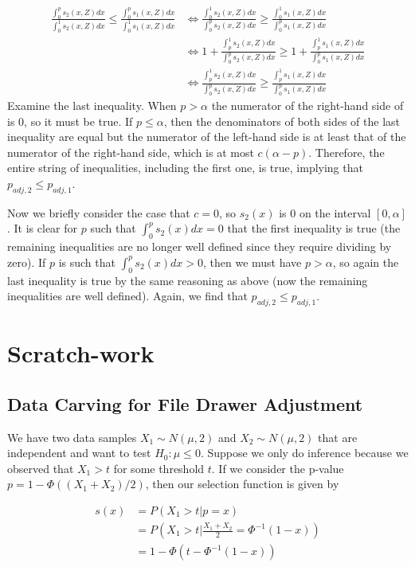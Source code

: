\documentclass{article}
\begin{document}
\begin{appendix}
\begin{align*}
    \frac{\int_0^p s_2(x, Z) dx }{\int_0^1 s_2(x, Z) dx}  \leq \frac{\int_0^p s_1(x, Z) dx }{\int_0^1 s_1(x, Z) dx} &\iff  \frac{\int_0^1 s_2(x, Z) dx}  {\int_0^p s_2(x, Z) dx }\geq \frac{\int_0^1 s_1(x, Z) dx}{\int_0^p s_1(x, Z) dx }\\
    &\iff 1 + \frac{\int_p^1 s_2(x, Z) dx}  {\int_0^p s_2(x, Z) dx }\geq 1 + \frac{\int_p^1 s_1(x, Z) dx}{\int_0^p s_1(x, Z) dx }\\
    &\iff \frac{\int_p^1 s_2(x, Z) dx}  {\int_0^p s_2(x, Z) dx }\geq \frac{\int_p^1 s_1(x, Z) dx}{\int_0^p s_1(x, Z) dx }
\end{align*}
Examine the last inequality. When $p > \alpha$ the numerator of the right-hand side of is $0$, so it must be true. If $p \leq \alpha$, then the denominators of both sides of the last inequality are equal but the numerator of the left-hand side is at least that of the numerator of the right-hand side, which is at most $c(\alpha - p)$. Therefore, the entire string of inequalities, including the first one, is true, implying that $p_{adj, 2} \leq p_{adj, 1}$. 

Now we briefly consider the case that $c=0$, so $s_2(x)$ is $0$ on the interval $[0, \alpha]$. It is clear for $p$ such that $\int_0^p s_2(x)dx = 0$ that the first inequality is true (the remaining inequalities are no longer well defined since they require dividing by zero). If $p$ is such that  $\int_0^p s_2(x)dx > 0$, then we must have $p > \alpha$, so again the last inequality is true by the same reasoning as above (now the remaining inequalities are well defined). Again, we find that $p_{adj, 2} \leq p_{adj, 1}$.

\section{Scratch-work}

\subsection{Data Carving for File Drawer Adjustment}

We have two data samples $X_1 \sim N(\mu, 2)$ and $X_2 \sim N(\mu, 2)$ that are independent and want to test $H_0 : \mu \leq 0$. Suppose we only do inference because we observed that $X_1  > t$ for some threshold $t$. If we consider the p-value $p = 1 - \Phi((X_1 + X_2)/2  )$, then our selection function is given by 

\begin{align*}
    s(x) &= P( X_1 > t | p = x ) \\
         &=  P( X_1 > t | \frac{X_1 + X_2}{2} =  \Phi^{-1}(1 -x) )\\
         &= 1 - \Phi(t - \Phi^{-1}(1 - x))
\end{align*}


\end{appendix}
\end{document}

